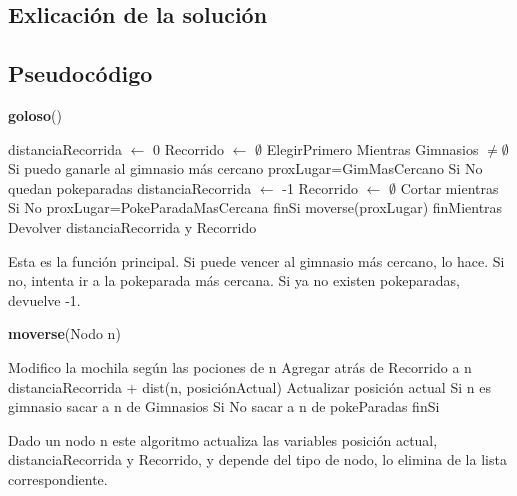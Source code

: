 \documentclass[spanish,12pt]{article}
\begin{document}
\subsection{Exlicación de la solución}



\subsection{Pseudocódigo}

\begin{algorithm}[H]{\textbf{goloso}()}
	\begin{algorithmic}[1]
		\State distanciaRecorrida $\gets$ 0
		\State Recorrido $\gets$ $\emptyset$
		\State ElegirPrimero
		\State Mientras Gimnasios $\not= \emptyset$
		\State \quad Si puedo ganarle al gimnasio más cercano
		\State \qquad proxLugar=GimMasCercano
		\State \quad Si No quedan pokeparadas 
		\State \qquad distanciaRecorrida $\gets$ -1
		\State \qquad Recorrido $\gets$ $\emptyset$
		\State \qquad Cortar mientras
		\State \quad Si No
		\State \qquad proxLugar=PokeParadaMasCercana
		\State \quad finSi
		\State \quad moverse(proxLugar)
		\State finMientras
		\State Devolver distanciaRecorrida y Recorrido 
	\end{algorithmic}
\end{algorithm}

Esta es la función principal. Si puede vencer al gimnasio más cercano, lo hace. Si no, intenta ir a la pokeparada más cercana. Si ya no existen pokeparadas, devuelve -1.

\begin{algorithm}[H]{\textbf{moverse}(Nodo n)}
	\begin{algorithmic}[1]
		\State Modifico la mochila según las pociones de n
		\State Agregar atrás de Recorrido a n
		\State distanciaRecorrida + dist(n, posiciónActual)
		\State Actualizar posición actual
		\State Si n es gimnasio
		\State \quad sacar a n de Gimnasios
		\State Si No
		\State \quad sacar a n de pokeParadas
		\State finSi
	\end{algorithmic}
\end{algorithm}

Dado un nodo n este algoritmo actualiza las variables posición actual, distanciaRecorrida y Recorrido, y depende del tipo de nodo, lo elimina de la lista correspondiente.
\end{document}
